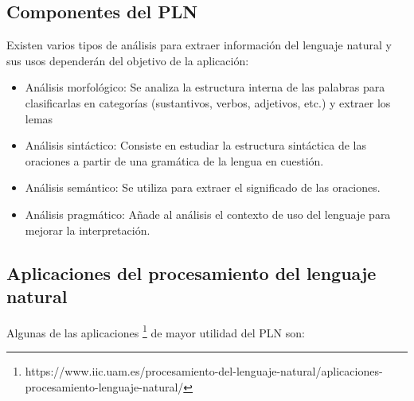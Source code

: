 \subsection{Componentes del PLN}

Existen varios tipos de análisis para extraer información del lenguaje natural y sus usos dependerán del objetivo de la aplicación:

\begin{itemize}
	\item Análisis morfológico: Se analiza la estructura interna de las palabras para clasificarlas en categorías (sustantivos, verbos, adjetivos, etc.) y extraer los lemas 
	
	\item Análisis sintáctico: Consiste en estudiar la estructura sintáctica de las oraciones a partir de una gramática de la lengua en cuestión.
	
	\item Análisis semántico: Se utiliza para extraer el significado de las oraciones.
	
	\item Análisis pragmático: Añade al análisis el contexto de uso del lenguaje para mejorar la interpretación.
\end{itemize}



\subsection{Aplicaciones del procesamiento del lenguaje natural}

Algunas de las aplicaciones \footnote{https://www.iic.uam.es/procesamiento-del-lenguaje-natural/aplicaciones-procesamiento-lenguaje-natural/} de mayor utilidad del PLN son:

